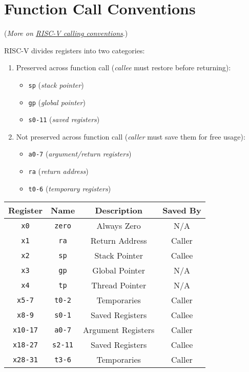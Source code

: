 \section{Function Call Conventions}
(\emph{More on \href{https://inst.eecs.berkeley.edu/~cs61c/resources/RISCV_Calling_Convention.pdf}{RISC-V calling conventions}}.)

\medskip
RISC-V divides registers into two categories:
\begin{enumerate}
	\item Preserved across function call (\emph{callee} must restore before returning):
		\begin{itemize}
			\item \texttt{sp} (\emph{stack pointer})
			\item \texttt{gp} (\emph{global pointer})
			\item \texttt{s0-11} (\emph{saved registers})
		\end{itemize}
	\item Not preserved across function call (\emph{caller} must save them for free usage):
		\begin{itemize}
			\item \texttt{a0-7} (\emph{argument/return registers})
			\item \texttt{ra} (\emph{return address})
			\item \texttt{t0-6} (\emph{temporary registers})
		\end{itemize}
\end{enumerate}

\begin{tabular}{ |c|c|c|c| } 
 \hline
 \textbf{Register} & \textbf{Name} & \textbf{Description} & \textbf{Saved By} \\ 
 \hline
 \texttt{x0} & \texttt{zero} & Always Zero & N/A \\
 \texttt{x1} & \texttt{ra} & Return Address & Caller \\
 \texttt{x2} & \texttt{sp} & Stack Pointer & Callee \\
 \texttt{x3} & \texttt{gp} & Global Pointer & N/A \\
 \texttt{x4} & \texttt{tp} & Thread Pointer & N/A \\
 \texttt{x5-7} & \texttt{t0-2} & Temporaries & Caller \\
 \texttt{x8-9} & \texttt{s0-1} & Saved Registers & Callee \\
 \texttt{x10-17} & \texttt{a0-7} & Argument Registers & Caller \\
 \texttt{x18-27} & \texttt{s2-11} & Saved Registers & Callee \\
 \texttt{x28-31} & \texttt{t3-6} & Temporaries & Caller \\
 \hline
\end{tabular}

